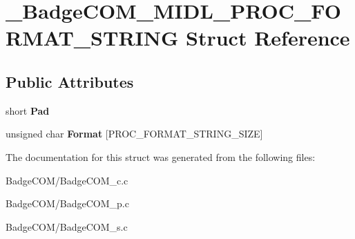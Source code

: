 \hypertarget{struct___badge_c_o_m___m_i_d_l___p_r_o_c___f_o_r_m_a_t___s_t_r_i_n_g}{\section{\-\_\-\-Badge\-C\-O\-M\-\_\-\-M\-I\-D\-L\-\_\-\-P\-R\-O\-C\-\_\-\-F\-O\-R\-M\-A\-T\-\_\-\-S\-T\-R\-I\-N\-G Struct Reference}
\label{struct___badge_c_o_m___m_i_d_l___p_r_o_c___f_o_r_m_a_t___s_t_r_i_n_g}
}
\subsection*{Public Attributes}
\begin{DoxyCompactItemize}
\item 
\hypertarget{struct___badge_c_o_m___m_i_d_l___p_r_o_c___f_o_r_m_a_t___s_t_r_i_n_g_ae325f9159d268dac3892aee743b3f552}{short {\bfseries Pad}}\label{struct___badge_c_o_m___m_i_d_l___p_r_o_c___f_o_r_m_a_t___s_t_r_i_n_g_ae325f9159d268dac3892aee743b3f552}

\item 
\hypertarget{struct___badge_c_o_m___m_i_d_l___p_r_o_c___f_o_r_m_a_t___s_t_r_i_n_g_a2cffd9a3fd22d9b742f3a792c3793114}{unsigned char {\bfseries Format} \mbox{[}P\-R\-O\-C\-\_\-\-F\-O\-R\-M\-A\-T\-\_\-\-S\-T\-R\-I\-N\-G\-\_\-\-S\-I\-Z\-E\mbox{]}}\label{struct___badge_c_o_m___m_i_d_l___p_r_o_c___f_o_r_m_a_t___s_t_r_i_n_g_a2cffd9a3fd22d9b742f3a792c3793114}

\end{DoxyCompactItemize}


The documentation for this struct was generated from the following files\-:\begin{DoxyCompactItemize}
\item 
Badge\-C\-O\-M/Badge\-C\-O\-M\-\_\-c.\-c\item 
Badge\-C\-O\-M/Badge\-C\-O\-M\-\_\-p.\-c\item 
Badge\-C\-O\-M/Badge\-C\-O\-M\-\_\-s.\-c\end{DoxyCompactItemize}
